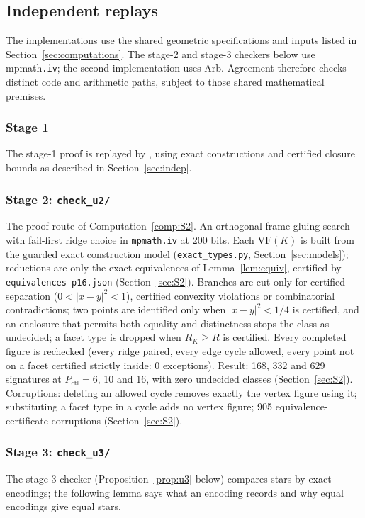 \documentclass[11pt]{article}
\theoremstyle{definition}
\theoremstyle{remark}
\newcommand{\VF}{\mathrm{VF}}
\newcommand{\file}[1]{\path{#1}}
\begin{document}
\subsection{Independent replays}\label{sec:replays}

The implementations use the shared geometric specifications and inputs
listed in Section~\ref{sec:computations}. The stage-2 and stage-3
checkers below use mpmath\texttt{.iv}; the second implementation uses Arb.
Agreement therefore checks distinct code and arithmetic paths, subject
to those shared mathematical premises.

\subsubsection{Stage 1}\label{sec:U1}
The stage-1 proof is replayed by \file{checks/independent-s1-b2/},
using exact constructions and certified closure bounds as described in
Section~\ref{sec:indep}.

\subsubsection{Stage 2: \texorpdfstring{\texttt{check\_u2/}}{check_u2/}}\label{sec:U2}
The proof route of Computation~\ref{comp:S2}. An orthogonal-frame gluing
search with fail-first ridge choice in \texttt{mpmath.iv} at 200 bits.
Each $\VF(K)$ is built from the guarded exact construction model
(\texttt{exact\_types.py}, Section~\ref{sec:models}); reductions are
only the exact equivalences of Lemma~\ref{lem:equiv}, certified by
\texttt{equivalences-p16.json} (Section~\ref{sec:S2}). Branches are
cut only for certified separation ($0<|x-y|^2<1$), certified convexity
violations or combinatorial contradictions; two points are identified only
when $|x-y|^2<1/4$ is certified, and an enclosure that permits both
equality and distinctness stops the class as undecided; a facet type is
dropped when $R_K\ge R$ is certified. Every completed figure is rechecked
(every ridge paired, every edge cycle allowed, every point not on a facet
certified strictly inside: 0 exceptions). Result: 168, 332 and 629
signatures at $P_{\mathrm{ctl}}=6$, 10 and 16, with
zero undecided classes (Section~\ref{sec:S2}). Corruptions: deleting an allowed cycle removes exactly the vertex
figure using it; substituting a facet type in a cycle adds no vertex
figure; 905 equivalence-certificate corruptions (Section~\ref{sec:S2}).

\subsubsection{Stage 3: \texorpdfstring{\texttt{check\_u3/}}{check_u3/}}\label{sec:U3}
The stage-3 checker (Proposition~\ref{prop:u3} below) compares stars by exact
encodings; the following lemma says what an
encoding records and why equal encodings give equal stars.
\end{document}
